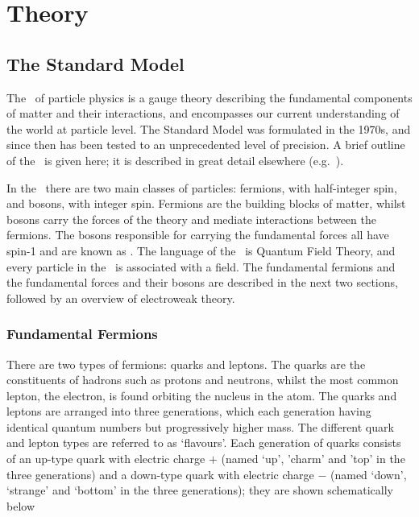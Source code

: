 \graphicspath{{Chapters/Theory/Figures/}}
\chapter{Theory}
\label{chap:Theory}

\section{The Standard Model}

The \sm\ of particle physics is a gauge theory describing the
fundamental components of matter and their interactions, and encompasses our
current understanding of the world at particle level. The Standard Model was
formulated in the 1970s, and since then has been tested to an unprecedented
level of precision. %
A brief outline of the \sm\ is given here; it is described in great detail
elsewhere (e.g.~\cite{ALTARELLI:2005zv}).

In the \sm\ there are two main classes of particles: fermions, with half-integer
spin, and bosons, with integer spin. Fermions are the building blocks of matter,
whilst bosons carry the forces of the theory and mediate interactions between the
fermions. The bosons responsible for carrying the fundamental forces all have
spin-1 and are known as .
The language of the \sm\ is Quantum Field Theory, and every particle in the \sm\
is associated with a field. The fundamental fermions and the fundamental forces
and their bosons are described in the next two sections, followed by an overview
of electroweak theory.

\subsection{Fundamental Fermions}

There are two types of fermions: quarks and leptons. The quarks are the
constituents of hadrons such as protons and neutrons, whilst the most common
lepton, the electron, is found orbiting the nucleus in the atom. 
The quarks and leptons are arranged into three generations, which each
generation having identical quantum numbers but progressively higher mass. The
different quark and lepton types are referred to as `flavours'. Each
generation of quarks consists of an up-type quark with electric charge
$+$\nicefrac{2}{3}
(named `up', 'charm' and 'top' in the three generations) and a down-type quark
with electric charge $-$\nicefrac{1}{3} (named `down', `strange' and `bottom' in the three
generations); they are shown schematically below

